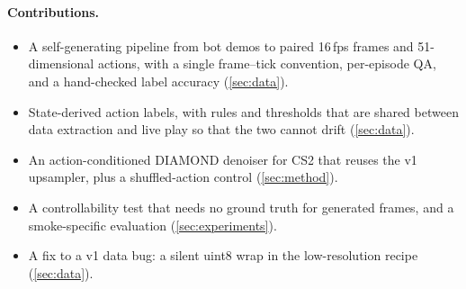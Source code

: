 \paragraph{Contributions.}
\begin{itemize}[nosep,leftmargin=1.2em]
  \item A self-generating pipeline from bot demos to paired 16\,fps frames and 51-dimensional actions, with a single frame--tick convention, per-episode QA, and a hand-checked label accuracy (\cref{sec:data}).
  \item State-derived action labels, with rules and thresholds that are shared between data extraction and live play so that the two cannot drift (\cref{sec:data}).
  \item An action-conditioned DIAMOND denoiser for CS2 that reuses the v1 upsampler, plus a shuffled-action control (\cref{sec:method}).
  \item A controllability test that needs no ground truth for generated frames, and a smoke-specific evaluation (\cref{sec:experiments}).
  \item A fix to a v1 data bug: a silent uint8 wrap in the low-resolution recipe (\cref{sec:data}).
\end{itemize}
